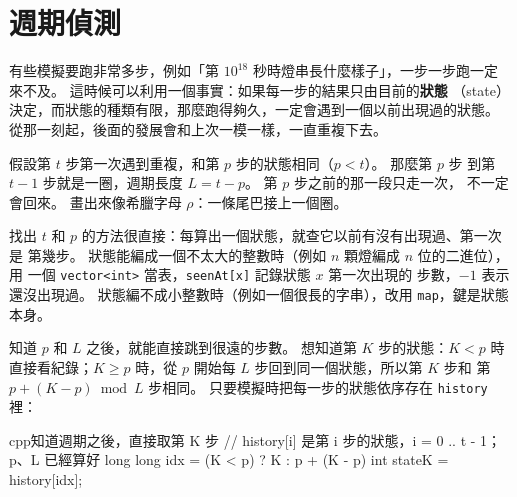 \section{週期偵測}
\label{sec:cycle}

有些模擬要跑非常多步，例如「第 $10^{18}$ 秒時燈串長什麼樣子」，一步一步跑一定
來不及。 這時候可以利用一個事實：如果每一步的結果只由目前的\textbf{狀態}
（state）決定，而狀態的種類有限，那麼跑得夠久，一定會遇到一個以前出現過的狀態。
從那一刻起，後面的發展會和上次一模一樣，一直重複下去。

假設第 $t$ 步第一次遇到重複，和第 $p$ 步的狀態相同（$p < t$）。 那麼第 $p$ 步
到第 $t - 1$ 步就是一圈，週期長度 $L = t - p$。 第 $p$ 步之前的那一段只走一次，
不一定會回來。 畫出來像希臘字母 $\rho$：一條尾巴接上一個圈。

\begin{center}
\label{fig:rho}
\end{center}

找出 $t$ 和 $p$ 的方法很直接：每算出一個狀態，就查它以前有沒有出現過、第一次是
第幾步。 狀態能編成一個不太大的整數時（例如 $n$ 顆燈編成 $n$ 位的二進位），用
一個 \texttt{vector<int>} 當表，\texttt{seenAt[x]} 記錄狀態 $x$ 第一次出現的
步數，$-1$ 表示還沒出現過。 狀態編不成小整數時（例如一個很長的字串），改用
\texttt{map}，鍵是狀態本身。

知道 $p$ 和 $L$ 之後，就能直接跳到很遠的步數。 想知道第 $K$ 步的狀態：$K < p$
時直接看紀錄；$K \ge p$ 時，從 $p$ 開始每 $L$ 步回到同一個狀態，所以第 $K$ 步和
第 $p + (K - p) \bmod L$ 步相同。 只要模擬時把每一步的狀態依序存在
\texttt{history} 裡：

\begin{code}{cpp}{知道週期之後，直接取第 K 步}
// history[i] 是第 i 步的狀態，i = 0 .. t - 1；p、L 已經算好
long long idx = (K < p) ? K : p + (K - p) %
int stateK = history[idx];
\end{code}

